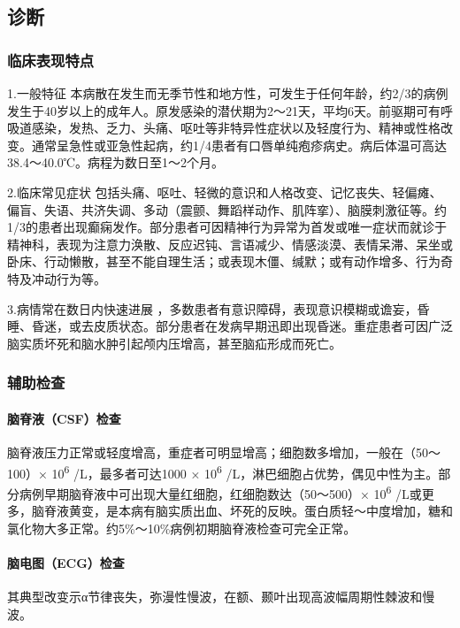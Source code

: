\subsection{诊断}

\subsubsection{临床表现特点}

1.一般特征
本病散在发生而无季节性和地方性，可发生于任何年龄，约2/3的病例发生于40岁以上的成年人。原发感染的潜伏期为2～21天，平均6天。前驱期可有呼吸道感染，发热、乏力、头痛、呕吐等非特异性症状以及轻度行为、精神或性格改变。通常呈急性或亚急性起病，约1/4患者有口唇单纯疱疹病史。病后体温可高达38.4～40.0℃。病程为数日至1～2个月。

2.临床常见症状
包括头痛、呕吐、轻微的意识和人格改变、记忆丧失、轻偏瘫、偏盲、失语、共济失调、多动（震颤、舞蹈样动作、肌阵挛）、脑膜刺激征等。约1/3的患者出现癫痫发作。部分患者可因精神行为异常为首发或唯一症状而就诊于精神科，表现为注意力涣散、反应迟钝、言语减少、情感淡漠、表情呆滞、呆坐或卧床、行动懒散，甚至不能自理生活；或表现木僵、缄默；或有动作增多、行为奇特及冲动行为等。

3.病情常在数日内快速进展
，多数患者有意识障碍，表现意识模糊或谵妄，昏睡、昏迷，或去皮质状态。部分患者在发病早期迅即出现昏迷。重症患者可因广泛脑实质坏死和脑水肿引起颅内压增高，甚至脑疝形成而死亡。

\subsubsection{辅助检查}

\paragraph{脑脊液（CSF）检查}

脑脊液压力正常或轻度增高，重症者可明显增高；细胞数多增加，一般在（50～100）×
10\textsuperscript{6} /L，最多者可达1000 × 10\textsuperscript{6}
/L，淋巴细胞占优势，偶见中性为主。部分病例早期脑脊液中可出现大量红细胞，红细胞数达（50～500）×
10\textsuperscript{6}
/L或更多，脑脊液黄变，是本病有脑实质出血、坏死的反映。蛋白质轻～中度增加，糖和氯化物大多正常。约5\%～10\%病例初期脑脊液检查可完全正常。

\paragraph{脑电图（ECG）检查}

其典型改变示α节律丧失，弥漫性慢波，在额、颞叶出现高波幅周期性棘波和慢波。

